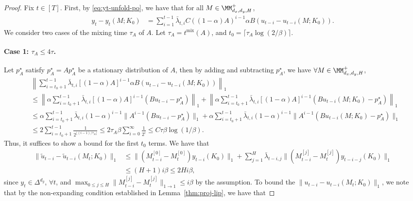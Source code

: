 \begin{proof} 
Fix $t \in [T]$. First, by \cref{eq:yt-unfold-po}, we have that for all $M\in\MM_{d_x,d_y,H}^{+}$, %
\begin{align}
\label{eq:yt-diff-nonmarkov}
y_t-y_t(M;K_0) &= \sum_{i=1}^{t-1}\bar{\lambda}_{t,i}C ((1-\alpha)A)^{i-1}\alpha B(u_{t-i}-u_{t-i}(M;K_0)). 
\end{align}
We consider two cases of the mixing time $\tau_A$ of $A$. Let $\tau_A=t^{\mathrm{mix}}(A)$, and $t_0=\lceil \tau_A\log(2/\beta)\rceil$. 

\paragraph{Case 1: $\tau_A\le 4\tau$.} Let $p_{A}^{\star}$ satisfy $p_{A}^{\star}=Ap_{A}^{\star}$ be a stationary distribution of $A$, then by adding and subtracting $p_{A}^{\star}$, we have $\forall M\in\MM_{d_x,d_y,H}^{+}$,
\begin{align*}
&\left\|\sum_{i=t_0+1}^{t-1}\bar{\lambda}_{t,i}[(1-\alpha)A]^{i-1}\alpha B(u_{t-i}-u_{t-i}(M;K_0))\right\|_1\\
&\le \left\|\alpha \sum_{i=t_0+1}^{t-1}\bar{\lambda}_{t,i}[(1-\alpha)A]^{i-1}(Bu_{t-i}-p_{A}^{\star})\right\|_1+ \left\|\alpha\sum_{i=t_0+1}^{t-1}\bar{\lambda}_{t,i}[(1-\alpha)A]^{i-1}(Bu_{t-i}(M;K_0)-p_{A}^{\star})\right\|_1\\
&\le \alpha \sum_{i=t_0+1}^{t-1}\bar{\lambda}_{t,i}(1-\alpha)^{i-1}\|A^{i-1}(Bu_{t-i}-p_{A}^{\star})\|_1+ \alpha\sum_{i=t_0+1}^{t-1}\bar{\lambda}_{t,i}(1-\alpha)^{i-1}\|A^{i-1}(Bu_{t-i}(M;K_0)-p_{A}^{\star})\|_1\\
&\le 2 \sum_{i=t_0+1}^{t-1} \frac{1}{2^{\lfloor (i-1)/\tau_A\rfloor}}\le 2\tau_A\beta\sum_{i=0}^{\infty}\frac{1}{2^i}\le C\tau\beta\log(1/\beta).
\end{align*}
Thus, it suffices to show a bound for the first $t_0$ terms. We have that
\begin{align*}
\|\tilde{u}_{t-i}-\tilde{u}_{t-i}(M_t;K_0)\|_1&\le \|(M_{t-i}^{[0]}-M_{t}^{[0]})y_{t-i}(K_0)\|_1+\sum_{j=1}^{H}\bar{\lambda}_{t-i,j}\|(M_{t-i}^{[j]}-M_{t}^{[j]})y_{t-i-j}(K_0)\|_1\\
&\le (H+1)i\beta\le 2Hi\beta,
\end{align*}
since $y_t\in\Delta^{d_y}$, $\forall t$, and $\max_{0\le j\le H}\|M_{t-i}^{[j]}-M_{t}^{[j]}\|_{1\rightarrow 1}\le i\beta$ by the assumption. To bound the $\|u_{t-i}-u_{t-i}(M_t;K_0)\|_1$, we note that by the non-expanding condition established in Lemma~\ref{thm:proj-lip}, we have that

\end{proof}
